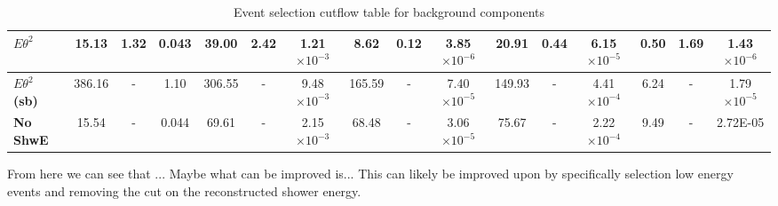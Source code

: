 \begin{landscape}
\begin{table}[!hb]
\begin{tabular}{|l|ccc|ccc|ccc|ccc|ccc|}
\textbf{$E\theta^2$}      & 15.13              & 1.32                                                                & 0.043                                      & 39.00                & 2.42                                                                  & 1.21$\times 10^{-3}$                                     & 8.62                  & 0.12                                                                   & 3.85$\times 10^{-6}$                                      & 20.91             & 0.44                                                               & 6.15$\times 10^{-5}$                                  & 0.50                 & 1.69                                                                  & 1.43$\times 10^{-6}$                                  \\\hline\hline
\textbf{$E\theta^2$ (sb)}  & 386.16             & -                                                            & 1.10                                       & 306.55               & -                                                                & 9.48$\times 10^{-3}$                                     & 165.59                & -                                                               & 7.40$\times 10^{-5}$                                      & 149.93            & -                                                             & 4.41$\times 10^{-4}$                                  & 6.24                 & -                                                              & 1.79$\times 10^{-5}$                                     \\\hline\hline
\textbf{No ShwE}  & 15.54              & -                                                                & 0.044                                      & 69.61                & -                                                                 & 2.15$\times 10^{-3}$                                     & 68.48                 & - & 3.06$\times 10^{-5}$                                      & 75.67             & - & 2.22$\times 10^{-4}$                                  & 9.49                 & -                                                                & 2.72E-05   \\\hline
\end{tabular}
\caption{Event selection cutflow table for background components}
\label{tab:CutflowTableBackground}
\end{table}
\end{landscape}

From here we can see that ... Maybe what can be improved is...
This can likely be improved upon by specifically selection low energy events and removing the cut on the reconstructed shower energy. 

